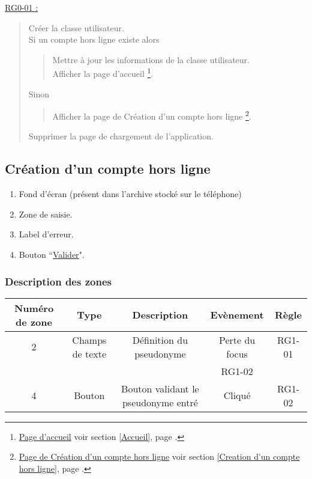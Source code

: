 \documentclass{report}
\begin{document}
		\underline{RG0-01 :}
		\begin{quote}
			Créer la classe utilisateur.\\
			Si un compte hors ligne existe alors
			\begin{quote}
				Mettre à jour les informations de la classe utilisateur.\\
				Afficher la page d'accueil%
				\footnote[1]{
					\hyperlink{Page d'accueil}{Page d'accueil}
					\og voir section \ref{Accueil}, page \pageref{Accueil}.\fg
				}.
			\end{quote}
			Sinon
			\begin{quote}
				Afficher la page de Création d'un compte hors ligne%
				\footnote[2]{
					\hyperlink{Création d'un compte hors ligne}{Page de Création d'un compte hors ligne}
					\og voir section \ref{Creation d'un compte hors ligne},	page \pageref{Creation d'un compte hors ligne}.\fg
				}.
			\end{quote}
			Supprimer la page de chargement de l'application.
		\end{quote}
	
\newpage

	\subsection{Création d'un compte hors ligne}
		\hypertarget{Creation d'un compte hors ligne}{}
		\label{Creation d'un compte hors ligne}

		\begin{center}
			
		\end{center}

		\begin{enumerate}
		  \item Fond d'écran (présent dans l'archive stocké sur le téléphone)
		  \item Zone de saisie.
		  \item Label d'erreur.
		  \item Bouton ``\hyperlink{Accueil}{Valider}".
		\end{enumerate}

		\subsubsection{Description des zones}
				
			\begin{tabular}{|c|c|c|c|c|} \hline
				Numéro de zone & Type  & Description & Evènement &	Règle \\\hline 
				2 & Champs de texte & Définition du pseudonyme & Perte du focus & RG1-01 \\
				  &                 &                          & RG1-02         & \\\hline
				4 & Bouton          & Bouton validant le pseudonyme entré & Cliqué & RG1-02 \\\hline
			\end{tabular}
\end{document}
